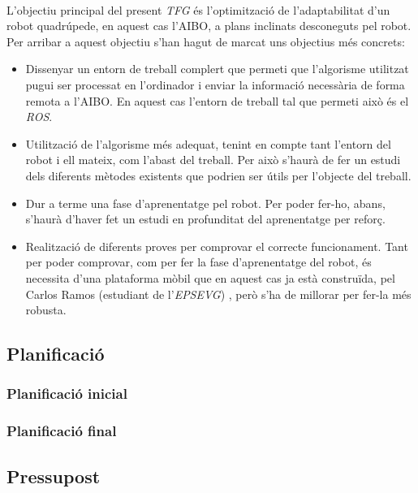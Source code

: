 \documentclass[12pt,a4paper,final,twoside]{article}
\begin{document}
\paragraph{}L'objectiu principal del present \textit{TFG} és l'optimització de l'adaptabilitat d'un robot quadrúpede, en aquest cas l'AIBO, a plans inclinats desconeguts pel robot. Per arribar a aquest objectiu s'han hagut de marcat uns objectius més concrets:
\begin{itemize}
\item Dissenyar un entorn de treball complert que permeti que l'algorisme utilitzat pugui ser processat en l'ordinador i enviar la informació necessària de forma remota a l'AIBO. En aquest cas l'entorn de treball tal que permeti això és el \textit{ROS}.
\item Utilització de l'algorisme més adequat, tenint en compte tant l'entorn del robot i ell mateix, com l'abast del treball. Per això s'haurà de fer un estudi dels diferents mètodes existents que podrien ser útils per l'objecte del treball.
\item Dur a terme una fase d'aprenentatge pel robot. Per poder fer-ho, abans, s'haurà d'haver fet un estudi en profunditat del aprenentatge per reforç.
\item Realització de diferents proves per comprovar el correcte funcionament. Tant per poder comprovar, com per fer la fase d'aprenentatge del robot, és necessita d'una plataforma mòbil que en aquest cas ja està construïda, pel Carlos Ramos (estudiant de l'\textit{EPSEVG}) \cite{TFG_Carlos_Ramos}, però s'ha de millorar per fer-la més robusta.
\end{itemize}



\subsection{Planificació}
\label{Planificacio}

\subsubsection{Planificació inicial}


\subsubsection{Planificació final}


\subsection{Pressupost}
\label{Pressupost}
\end{document}
